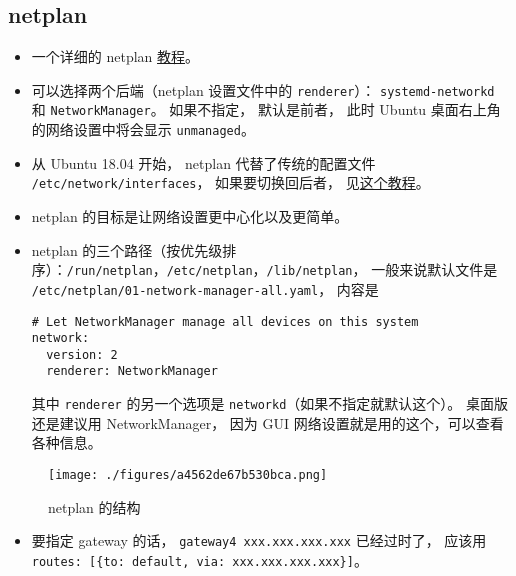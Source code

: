 \subsection{netplan}
\begin{itemize}
\item 一个详细的 netplan \href{https://linuxconfig.org/netplan-network-configuration-tutorial-for-beginners}{教程}。
\item 可以选择两个后端（netplan 设置文件中的 \verb`renderer`）： \verb`systemd-networkd` 和 \verb`NetworkManager`。 如果不指定， 默认是前者， 此时 Ubuntu 桌面右上角的网络设置中将会显示 \verb`unmanaged`。
\item 从 Ubuntu 18.04 开始， netplan 代替了传统的配置文件 \verb`/etc/network/interfaces`， 如果要切换回后者， 见\href{https://linuxconfig.org/how-to-switch-back-networking-to-etc-network-interfaces-on-ubuntu-20-04-focal-fossa-linux}{这个教程}。
\item netplan 的目标是让网络设置更中心化以及更简单。
\item netplan 的三个路径（按优先级排序）：\verb`/run/netplan`，\verb`/etc/netplan`，\verb`/lib/netplan`， 一般来说默认文件是 \verb`/etc/netplan/01-network-manager-all.yaml`， 内容是
\begin{lstlisting}[language=none]
# Let NetworkManager manage all devices on this system
network:
  version: 2
  renderer: NetworkManager
\end{lstlisting}
其中 \verb`renderer` 的另一个选项是 \verb`networkd`（如果不指定就默认这个）。 桌面版还是建议用 NetworkManager， 因为 GUI 网络设置就是用的这个，可以查看各种信息。
\end{itemize}

\begin{figure}[ht]
\centering
\texttt{[image: ./figures/a4562de67b530bca.png]}
\caption{netplan 的结构} \label{fig_LinWeb_1}
\end{figure}

\begin{itemize}
\item 要指定 gateway 的话， \verb`gateway4 xxx.xxx.xxx.xxx` 已经过时了， 应该用 \verb`routes: [{to: default, via: xxx.xxx.xxx.xxx}]`。
\end{itemize}

